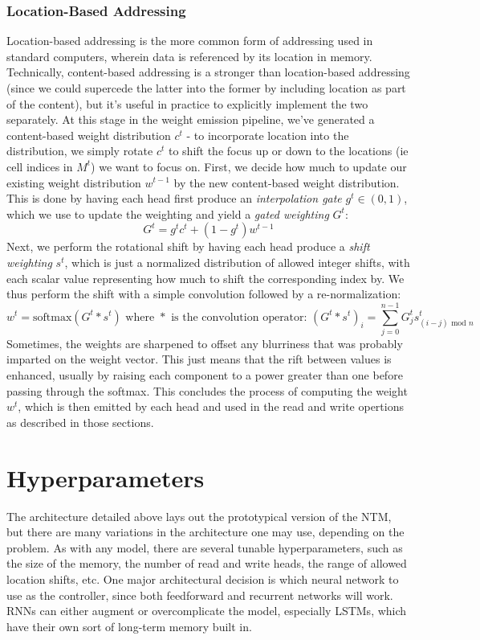 \documentclass{article}
\begin{document}
\subsubsection{Location-Based Addressing}
Location-based addressing is the more common form of addressing used in standard computers, wherein data is referenced by its location in memory. Technically, content-based addressing is a stronger than location-based addressing (since we could supercede the latter into the former by including location as part of the content), but it's useful in practice to explicitly implement the two separately. At this stage in the weight emission pipeline, we've generated a content-based weight distribution $ c^t $ - to incorporate location into the distribution, we simply rotate $ c^t $ to shift the focus up or down to the locations (ie cell indices in $ M^t $) we want to focus on.
\newline \newline
First, we decide how much to update our existing weight distribution $ w^{t - 1} $ by the new content-based weight distribution. This is done by having each head first produce an \textit{interpolation gate} $ g^t \in (0, 1) $, which we use to update the weighting and yield a \textit{gated weighting} $ G^t $:
$$ G^t = g^t c^t + (1 - g^t) w^{t - 1} $$
\newline
Next, we perform the rotational shift by having each head produce a \textit{shift weighting} $ s^t $, which is just a normalized distribution of allowed integer shifts, with each scalar value representing how much to shift the corresponding index by. We thus perform the shift with a simple convolution followed by a re-normalization:
$$ w^t = \text{softmax}(G^t * s^t) \text{ where } * \text{ is the convolution operator: } (G^t * s^t)_i = \sum_{j = 0}^{n - 1} G^t_j s^t_{(i - j) \text{ mod } n} $$
Sometimes, the weights are sharpened to offset any blurriness that was probably imparted on the weight vector. This just means that the rift between values is enhanced, usually by raising each component to a power greater than one before passing through the softmax. This concludes the process of computing the weight $ w^t $, which is then emitted by each head and used in the read and write opertions as described in those sections.

\section{Hyperparameters}
The architecture detailed above lays out the prototypical version of the NTM, but there are many variations in the architecture one may use, depending on the problem. As with any model, there are several tunable hyperparameters, such as the size of the memory, the number of read and write heads, the range of allowed location shifts, etc. One major architectural decision is which neural network to use as the controller, since both feedforward and recurrent networks will work. RNNs can either augment or overcomplicate the model, especially LSTMs, which have their own sort of long-term memory built in.
\end{document}

